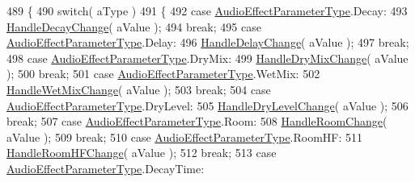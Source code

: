 \begin{DoxyCode}
489         \{
490             \textcolor{keywordflow}{switch}( aType )
491             \{
492                 \textcolor{keywordflow}{case} \hyperlink{class_a_t_i_a1123d61b8dceb5867a3683e8d2224ee1}{AudioEffectParameterType}.Decay:
493                     \hyperlink{class_a_t_i_1_1_audio_effect_handler_ae8a88211ac0910dc4b7752667abb2f84}{HandleDecayChange}( aValue );
494                     \textcolor{keywordflow}{break};
495                 \textcolor{keywordflow}{case} \hyperlink{class_a_t_i_a1123d61b8dceb5867a3683e8d2224ee1}{AudioEffectParameterType}.Delay:
496                     \hyperlink{class_a_t_i_1_1_audio_effect_handler_a5371fca4c2e86cecfc264dfc7559b6bd}{HandleDelayChange}( aValue );
497                     \textcolor{keywordflow}{break};
498                 \textcolor{keywordflow}{case} \hyperlink{class_a_t_i_a1123d61b8dceb5867a3683e8d2224ee1}{AudioEffectParameterType}.DryMix:
499                     \hyperlink{class_a_t_i_1_1_audio_effect_handler_a8d83371e2e982373b4eb04198a8514fb}{HandleDryMixChange}( aValue );
500                     \textcolor{keywordflow}{break};
501                 \textcolor{keywordflow}{case} \hyperlink{class_a_t_i_a1123d61b8dceb5867a3683e8d2224ee1}{AudioEffectParameterType}.WetMix:
502                     \hyperlink{class_a_t_i_1_1_audio_effect_handler_a630d6f0e674c531ad0c138181609a895}{HandleWetMixChange}( aValue );
503                     \textcolor{keywordflow}{break};
504                 \textcolor{keywordflow}{case} \hyperlink{class_a_t_i_a1123d61b8dceb5867a3683e8d2224ee1}{AudioEffectParameterType}.DryLevel:
505                     \hyperlink{class_a_t_i_1_1_audio_effect_handler_abf6b4a6ead7e60bbaea15f94936c316e}{HandleDryLevelChange}( aValue );
506                     \textcolor{keywordflow}{break};
507                 \textcolor{keywordflow}{case} \hyperlink{class_a_t_i_a1123d61b8dceb5867a3683e8d2224ee1}{AudioEffectParameterType}.Room:
508                     \hyperlink{class_a_t_i_1_1_audio_effect_handler_a416ae6f8266224b0d6cd71cba1020001}{HandleRoomChange}( aValue );
509                     \textcolor{keywordflow}{break};
510                 \textcolor{keywordflow}{case} \hyperlink{class_a_t_i_a1123d61b8dceb5867a3683e8d2224ee1}{AudioEffectParameterType}.RoomHF:
511                     \hyperlink{class_a_t_i_1_1_audio_effect_handler_af3f3b123b89b6e53dce5a7c22190f5b6}{HandleRoomHFChange}( aValue );
512                     \textcolor{keywordflow}{break};
513                 \textcolor{keywordflow}{case} \hyperlink{class_a_t_i_a1123d61b8dceb5867a3683e8d2224ee1}{AudioEffectParameterType}.DecayTime:

\end{DoxyCode}
